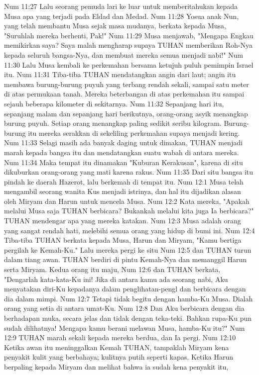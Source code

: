 Num 11:27  Lalu seorang pemuda lari ke luar untuk memberitahukan kepada Musa apa yang terjadi pada Eldad dan Medad.
Num 11:28  Yosua anak Nun, yang telah membantu Musa sejak masa mudanya, berkata kepada Musa, "Suruhlah mereka berhenti, Pak!"
Num 11:29  Musa menjawab, "Mengapa Engkau memikirkan saya? Saya malah mengharap supaya TUHAN memberikan Roh-Nya kepada seluruh bangsa-Nya, dan membuat mereka semua menjadi nabi!"
Num 11:30  Lalu Musa kembali ke perkemahan bersama ketujuh puluh pemimpin Israel itu.
Num 11:31  Tiba-tiba TUHAN mendatangkan angin dari laut; angin itu membawa burung-burung puyuh yang terbang rendah sekali, sampai satu meter di atas permukaan tanah. Mereka beterbangan di atas perkemahan itu sampai sejauh beberapa kilometer di sekitarnya.
Num 11:32  Sepanjang hari itu, sepanjang malam dan sepanjang hari berikutnya, orang-orang asyik menangkap burung puyuh. Setiap orang menangkap paling sedikit seribu kilogram. Burung-burung itu mereka serakkan di sekeliling perkemahan supaya menjadi kering.
Num 11:33  Selagi masih ada banyak daging untuk dimakan, TUHAN menjadi marah kepada bangsa itu dan mendatangkan suatu wabah di antara mereka.
Num 11:34  Maka tempat itu dinamakan "Kuburan Kerakusan", karena di situ dikuburkan orang-orang yang mati karena rakus.
Num 11:35  Dari situ bangsa itu pindah ke daerah Hazerot, lalu berkemah di tempat itu.
Num 12:1  Musa telah mengambil seorang wanita Kus menjadi istrinya, dan hal itu dijadikan alasan oleh Miryam dan Harun untuk mencela Musa.
Num 12:2  Kata mereka, "Apakah melalui Musa saja TUHAN berbicara? Bukankah melalui kita juga Ia berbicara?" TUHAN mendengar apa yang mereka katakan.
Num 12:3  Musa adalah orang yang sangat rendah hati, melebihi semua orang yang hidup di bumi ini.
Num 12:4  Tiba-tiba TUHAN berkata kepada Musa, Harun dan Miryam, "Kamu bertiga pergilah ke Kemah-Ku." Lalu mereka pergi ke situ
Num 12:5  dan TUHAN turun dalam tiang awan. TUHAN berdiri di pintu Kemah-Nya dan memanggil Harun serta Miryam. Kedua orang itu maju,
Num 12:6  dan TUHAN berkata, "Dengarlah kata-kata-Ku ini! Jika di antara kamu ada seorang nabi, Aku menyatakan diri-Ku kepadanya dalam penglihatan-pengl dan berbicara dengan dia dalam mimpi.
Num 12:7  Tetapi tidak begitu dengan hamba-Ku Musa. Dialah orang yang setia di antara umat-Ku.
Num 12:8  Dan Aku berbicara dengan dia berhadapan muka, secara jelas dan tidak dengan teka-teki. Bahkan rupa-Ku pun sudah dilihatnya! Mengapa kamu berani melawan Musa, hamba-Ku itu?"
Num 12:9  TUHAN marah sekali kepada mereka berdua, dan Ia pergi.
Num 12:10  Ketika awan itu meninggalkan Kemah TUHAN, tampaklah Miryam kena penyakit kulit yang berbahaya; kulitnya putih seperti kapas. Ketika Harun berpaling kepada Miryam dan melihat bahwa ia sudah kena penyakit itu,
